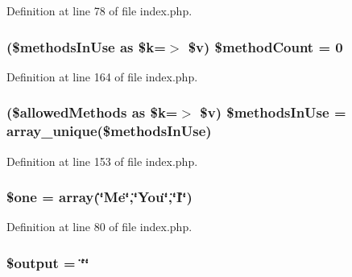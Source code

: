 Definition at line 78 of file index.\-php.

\hypertarget{index_8php_a56c1b7384519355df73a254a12f0bae3}{
\subsubsection[{\$method\-Count}]{ (\$methods\-In\-Use as \$k=$>$ \$v) \$method\-Count = 0}}\label{index_8php_a56c1b7384519355df73a254a12f0bae3}


Definition at line 164 of file index.\-php.

\hypertarget{index_8php_a1c475c0c53206fb15c4c3028bb7d5c7c}{
\subsubsection[{\$methods\-In\-Use}]{ (\$allowed\-Methods as \$k=$>$ \$v) \$methods\-In\-Use = array\-\_\-unique(\$methods\-In\-Use)}}\label{index_8php_a1c475c0c53206fb15c4c3028bb7d5c7c}


Definition at line 153 of file index.\-php.

\hypertarget{index_8php_a95601f0019d098a2b40f33f5939e799b}{
\subsubsection[{\$one}]{\setlength{\rightskip}{0pt plus 5cm}\$one = array(\char`\"{}Me\char`\"{},\char`\"{}You\char`\"{},\char`\"{}I\char`\"{})}}\label{index_8php_a95601f0019d098a2b40f33f5939e799b}


Definition at line 80 of file index.\-php.

\hypertarget{index_8php_a73004ce9cd673c1bfafd1dc351134797}{
\subsubsection[{\$output}]{\setlength{\rightskip}{0pt plus 5cm}\$output = \char`\"{}\char`\"{}}}\label{index_8php_a73004ce9cd673c1bfafd1dc351134797}


